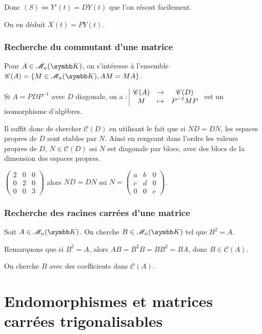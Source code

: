 Donc $(S) \iff Y'(t) = D Y(t)$ que l'on résout facilement. 

On en déduit $X(t) = P Y(t)$.

\subsubsection{Recherche du commutant d'une matrice }

Pour $A \in \mathscr M_n(\K)$, on s'intéresse à l'ensemble $\mathscr C(A) = \{M \in \mathscr M_n(\K), AM = MA\}$.

Si $A = PDP^{-1}$ avec $D$ diagonale, on a 
$: \space \begin{array}{|ccc} \displaystyle \mathscr C (A) & \to & \displaystyle \mathscr C(D) \\ \displaystyle M & \mapsto & \displaystyle P^{-1} M P \end{array}$ est un isomorphisme d'algèbres.

Il suffit donc de chercher $\mathscr C(D)$ en utilisant le fait que si 
$ND = DN$, les espaces propres de $D$ sont stables par $N$. Ainsi en rengeant dans l'ordre les valeurs propres
de $D$, $N \in \mathscr C(D)$ ssi $N$ est diagonale par blocs, avec des blocs de la dimension des espaces propres. 

\begin{exemple}
    $\begin{pmatrix}
        2 & 0 & 0 \\
        0 & 2 & 0 \\
        0 & 0 & 3
    \end{pmatrix}$ alors $ND = DN$ ssi $N = \begin{pmatrix}
        a & b & 0 \\
        c & d & 0 \\
        0 & 0 & e
    \end{pmatrix}$.
\end{exemple}

\subsubsection{Recherche des racines carrées d'une matrice }

Soit $A \in \mathscr M_n(\K)$. On cherche $B \in \mathscr M_n(\K)$ tel que $B^2 = A$.

Remarquons que si $B^2 = A$, alors $AB = B^2B = BB^2 = BA$, donc $B \in \mathscr C(A)$.

On cherche $B$ avec des coefficients dans $\mathscr C(A)$.

\section{Endomorphismes et matrices carrées trigonalisables}
